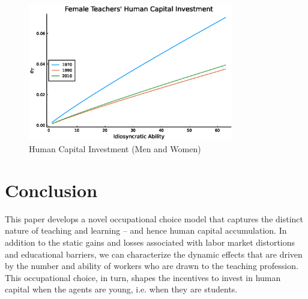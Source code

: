 \documentclass[onehalfspacing,11pt]{article}
\begin{document}
	\begin{figure}
		\begin{center}
			\includegraphics[width=0.8\textwidth]{eT_women_steadystate.eps}
			\caption{Human Capital Investment (Men and Women)}
			\label{fig:humcap}
		\end{center}
	\end{figure}
	
	
	
	
	
	\newpage
	\section{Conclusion}\label{sec:conclusion}
	This paper develops a novel occupational choice model that captures the distinct nature of teaching and learning -- and hence human capital accumulation. In addition to the static gains and losses associated with labor market distortions and educational barriers, we can characterize the dynamic effects that are driven by the number and ability of workers who are drawn to the teaching profession. This occupational choice, in turn, shapes the incentives to invest in human capital when the agents are young, i.e. when they are students.
	
\end{document}
